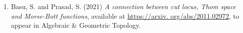\begin{enumerate}
    \item Basu, S. and Prasad, S. (2021) \textit{A connection between cut locus, Thom space and Morse-Bott functions}, available at \url{https://arxiv.
    org/abs/2011.02972}, to appear in Algebraic \&  Geometric Topology.
\end{enumerate}
